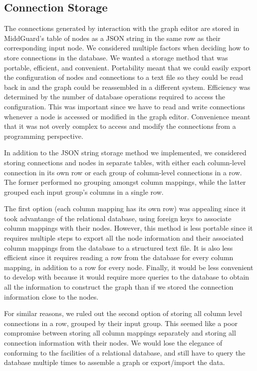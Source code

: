 \documentclass[midd]{thesis}
\begin{document}
\subsection{Connection Storage}

The connections generated by interaction with the graph editor are stored in
MiddGuard's table of nodes as a JSON string in the same row as their
corresponding input node. We considered multiple factors when deciding how to
store connections in the database. We wanted a storage method that was portable,
efficient, and convenient. Portability meant that we could easily export the
configuration of nodes and connections to a text file so they could be read back
in and the graph could be reassembled in a different system. Efficiency was
determined by the number of database operations required to access the
configuration. This was important since we have to read and write connections
whenever a node is accessed or modified in the graph editor. Convenience meant
that it was not overly complex to access and modify the connections from a
programming perspective.

In addition to the JSON string storage method we implemented, we considered
storing connections and nodes in separate tables, with either each column-level
connection in its own row or each group of column-level connections in a row.
The former performed no grouping amongst column mappings, while the latter
grouped each input group's columns in a single row.

The first option (each column mapping has its own row) was appealing since it
took advantange of the relational database, using foreign keys to associate
column mappings with their nodes. However, this method is less portable since it
requires multiple steps to export all the node information and their associated
column mappings from the database to a structured text file. It is also less
efficient since it requires reading a row from the database for every column
mapping, in addition to a row for every node. Finally, it would be less
convenient to develop with because it would require more queries to the database
to obtain all the information to construct the graph than if we stored the
connection information close to the nodes.

For similar reasons, we ruled out the second option of storing all column level
connections in a row, grouped by their input group. This seemed like a poor
compromise between storing all column mappings separately and storing all
connection information with their nodes. We would lose the elegance of
conforming to the facilities of a relational database, and still have to query
the database multiple times to assemble a graph or export/import the data.
\end{document}
